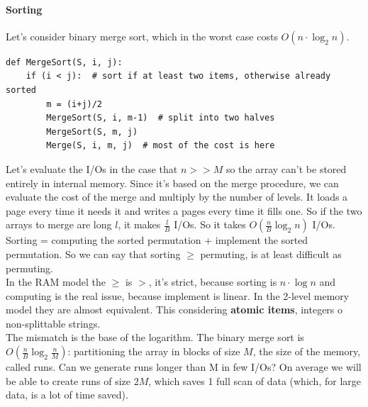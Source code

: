 \documentclass[10pt]{report}
\begin{document}
\paragraph{Sorting} Let's consider binary merge sort, which in the worst case costs $O(n\cdot \log_2 n)$.
\begin{lstlisting}[style=myPython]
def MergeSort(S, i, j):
	if (i < j):  # sort if at least two items, otherwise already sorted
		m = (i+j)/2
		MergeSort(S, i, m-1)  # split into two halves
		MergeSort(S, m, j)
		Merge(S, i, m, j)  # most of the cost is here
\end{lstlisting}
Let's evaluate the I/Os in the case that $n >> M$ so the array can't be stored entirely in internal memory. Since it's based on the merge procedure, we can evaluate the cost of the merge and multiply by the number of levels. It loads a page every time it needs it and writes a pages every time it fills one. So if the two arrays to merge are long $l$, it makes $\frac{l}{B}$ I/Os. So it takes $O(\frac{n}{B} \log_2 n)$ I/Os.\\
Sorting = computing the sorted permutation + implement the sorted permutation. So we can say that sorting $\geq$ permuting, is at least difficult as permuting.\\
In the RAM model the $\geq$ is $>$, it's strict, because sorting is $n\cdot\log n$ and computing is the real issue, because implement is linear. In the 2-level memory model they are almost equivalent. This considering \textbf{atomic items}, integers o non-splittable strings.\\
The mismatch is the base of the logarithm. The binary merge sort is $O(\frac{n}{B} \log_2 \frac{n}{M})$: partitioning the array in blocks of size $M$, the size of the memory, called runs. Can we generate runs longer than M in few I/Os? On average we will be able to create runs of size $2M$, which saves 1 full scan of data (which, for large data, is a lot of time saved).
\end{document}

